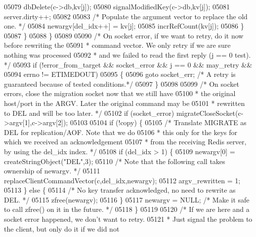 \begin{DoxyCode}
{{{{{{{{{{{{{{{{{{{{{{{{{{{{{{{{{{{{{{{{{{{{{{{{{{{{{{{{{{{{{{{{{{{{{{{{{{{{{{{{{{{{{{{{{{{{{{{{{{{{{{{{{{{{05079                 dbDelete(c->db,kv[j]);
05080                 signalModifiedKey(c->db,kv[j]);
05081                 server.dirty++;
05082 
05083                 \textcolor{comment}{/* Populate the argument vector to replace the old one. */}
05084                 newargv[del\_idx++] = kv[j];
05085                 incrRefCount(kv[j]);
05086             \}
05087         \}
05088     \}
05089 
05090     \textcolor{comment}{/* On socket error, if we want to retry, do it now before rewriting the}
05091 \textcolor{comment}{     * command vector. We only retry if we are sure nothing was processed}
05092 \textcolor{comment}{     * and we failed to read the first reply (j == 0 test). */}
05093     \textcolor{keywordflow}{if} (!error\_from\_target && socket\_error && j == 0 && may\_retry &&
05094         errno != ETIMEDOUT)
05095     \{
05096         \textcolor{keywordflow}{goto} socket\_err; \textcolor{comment}{/* A retry is guaranteed because of tested conditions.*/}
05097     \}
05098 
05099     \textcolor{comment}{/* On socket errors, close the migration socket now that we still have}
05100 \textcolor{comment}{     * the original host/port in the ARGV. Later the original command may be}
05101 \textcolor{comment}{     * rewritten to DEL and will be too later. */}
05102     \textcolor{keywordflow}{if} (socket\_error) migrateCloseSocket(c->argv[1],c->argv[2]);
05103 
05104     \textcolor{keywordflow}{if} (!copy) \{
05105         \textcolor{comment}{/* Translate MIGRATE as DEL for replication/AOF. Note that we do}
05106 \textcolor{comment}{         * this only for the keys for which we received an acknowledgement}
05107 \textcolor{comment}{         * from the receiving Redis server, by using the del\_idx index. */}
05108         \textcolor{keywordflow}{if} (del\_idx > 1) \{
05109             newargv[0] = createStringObject(\textcolor{stringliteral}{"DEL"},3);
05110             \textcolor{comment}{/* Note that the following call takes ownership of newargv. */}
05111             replaceClientCommandVector(c,del\_idx,newargv);
05112             argv\_rewritten = 1;
05113         \} \textcolor{keywordflow}{else} \{
05114             \textcolor{comment}{/* No key transfer acknowledged, no need to rewrite as DEL. */}
05115             zfree(newargv);
05116         \}
05117         newargv = NULL; \textcolor{comment}{/* Make it safe to call zfree() on it in the future. */}
05118     \}
05119 
05120     \textcolor{comment}{/* If we are here and a socket error happened, we don't want to retry.}
05121 \textcolor{comment}{     * Just signal the problem to the client, but only do it if we did not}
}}}}}}}}}}}}}}}}}}}}}}}}}}}}}}}}}}}}}}}}}}}}}}}}}}}}}}}}}}}}}}}}}}}}}}}}}}}}}}}}}}}}}}}}}}}}}}}}}}}}}}}}}}}}
\end{DoxyCode}
